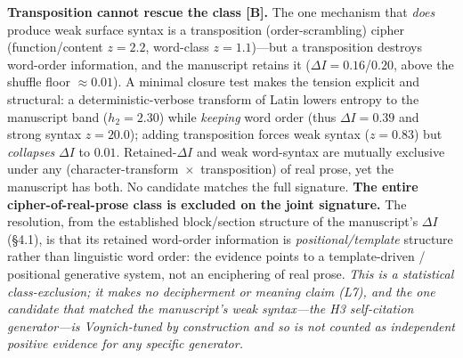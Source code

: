 \documentclass[11pt]{article}
\newcommand{\grade}[1]{{\small\textbf{[#1]}}}
\begin{document}
\textbf{Transposition cannot rescue the class \grade{B}.} The one mechanism that
\emph{does} produce weak surface syntax is a transposition (order-scrambling) cipher
(function/content $z=2.2$, word-class $z=1.1$)---but a transposition destroys word-order
information, and the manuscript retains it ($\Delta I=0.16$/$0.20$, above the shuffle
floor $\approx0.01$). A minimal closure test makes the tension explicit and structural:
a deterministic-verbose transform of Latin lowers entropy to the manuscript band
($h_2=2.30$) while \emph{keeping} word order (thus $\Delta I=0.39$ and strong syntax
$z=20.0$); adding transposition forces weak syntax ($z=0.83$) but \emph{collapses}
$\Delta I$ to $0.01$. Retained-$\Delta I$ and weak word-syntax are mutually exclusive
under any (character-transform~$\times$~transposition) of real prose, yet the manuscript
has both. No candidate matches the full signature. \textbf{The entire
cipher-of-real-prose class is excluded on the joint signature.} The resolution, from the
established block/section structure of the manuscript's $\Delta I$ (\S4.1), is that its
retained word-order information is \emph{positional/template} structure rather than
linguistic word order: the evidence points to a template-driven / positional generative
system, not an enciphering of real prose. \emph{This is a statistical class-exclusion;
it makes no decipherment or meaning claim (L7), and the one candidate that matched the
manuscript's weak syntax---the H3 self-citation generator---is Voynich-tuned by
construction and so is not counted as independent positive evidence for any specific
generator.}
\end{document}
